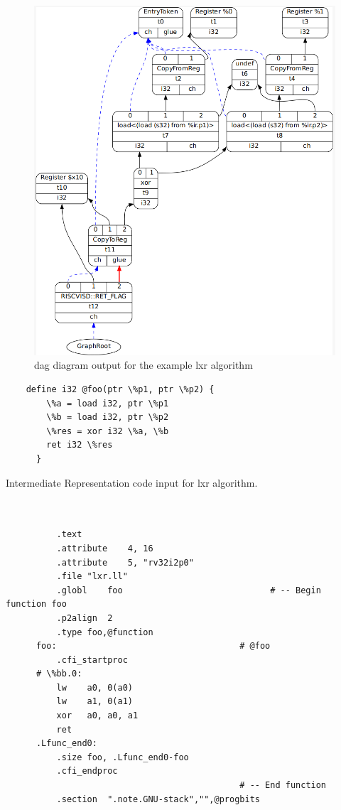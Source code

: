 \begin{figure}
    \centering
    \includegraphics[scale=0.5]{adding_new_instr/lxr_dag_diagram.png}
    \caption{dag diagram output for the example lxr algorithm}
    \label{fig:lxr_dag_diagram}
\end{figure}

\begin{lstlisting}
    define i32 @foo(ptr \%p1, ptr \%p2) {
        \%a = load i32, ptr \%p1
        \%b = load i32, ptr \%p2
        \%res = xor i32 \%a, \%b
        ret i32 \%res
      }
\end{lstlisting}

Intermediate Representation code input for lxr algorithm.
\\\\

\begin{lstlisting}
      
          .text
          .attribute	4, 16
          .attribute	5, "rv32i2p0"
          .file	"lxr.ll"
          .globl	foo                             # -- Begin function foo
          .p2align	2
          .type	foo,@function
      foo:                                    # @foo
          .cfi_startproc
      # \%bb.0:
          lw	a0, 0(a0)
          lw	a1, 0(a1)
          xor	a0, a0, a1
          ret
      .Lfunc_end0:
          .size	foo, .Lfunc_end0-foo
          .cfi_endproc
                                              # -- End function
          .section	".note.GNU-stack","",@progbits
      
      
\end{lstlisting}

